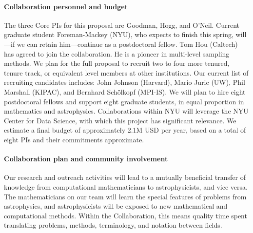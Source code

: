 \documentclass[12pt]{article}
\newcommand{\foreign}[1]{\textsl{#1}}
\newcommand{\etal}{\foreign{et~al.}}
\begin{document}

\paragraph{Collaboration personnel and budget}

The three Core PIs for this proposal are Goodman, Hogg, and O'Neil.
Current graduate student Foreman-Mackey (NYU), who expects to finish
this spring, will---if we can retain him---continue as a postdoctoral
fellow.
Tom Hou (Caltech) has agreed to join the collaboration.
He is a pioneer in multi-level sampling methods.
We plan for the full proposal to recruit two to four more tenured,
tenure track, or equivalent level members at other institutions.  Our
current list of recruiting candidates includes: John
Johnson (Harvard), Mario Juric (UW), Phil Marshall (KIPAC), and Bernhard
Sch\"olkopf (MPI-IS).
We will plan to hire eight postdoctoral fellows and support eight
graduate students, in equal proportion in mathematics and astrophysics.
Collaborations within NYU will leverage the NYU Center for Data Science,
with which this project has significant relevance.
We estimate a final budget of approximately 2.1M USD per year,
based on a total of eight PIs and their commitments approximate.

\paragraph{Collaboration plan and community involvement}

Our research and outreach activities will lead to a mutually beneficial
transfer of knowledge from computational mathematicians to
astrophysicists, and vice versa.
The mathematicians on our team will learn the special features of
problems from astrophysics, and astrophysicists will be exposed to new
mathematical and computational methods.
Within the Collaboration, this means quality time spent translating
problems, methods, terminology, and notation between fields.
\end{document}
